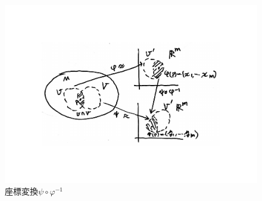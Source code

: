 \documentclass[a4j,12pt]{jarticle}
\theoremstyle{definition}
\begin{document}
\begin{figure}[H]
    \centering
    \includegraphics[keepaspectratio, scale=0.5]{coordinateConversionBig.pdf}
    \caption{座標変換$\psi \circ \varphi^{-1}$}
    \label{coordinateConversion}
   \end{figure}
   
\end{document}

